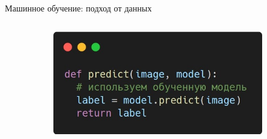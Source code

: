 \documentclass[aspectratio=169]{beamer}
\begin{document}
\begin{frame}{Машинное обучение: подход от данных}
\begin{columns}[T]
\begin{column}{.6\linewidth}
\begin{figure}
                \begin{subfigure}[b]{.57\linewidth}
                    \includegraphics[width=\linewidth]{graphs/fig15_1.jpg}
                \end{subfigure}
            \end{figure}
        \end{column}
    \end{columns}
\end{frame}
\end{document}
